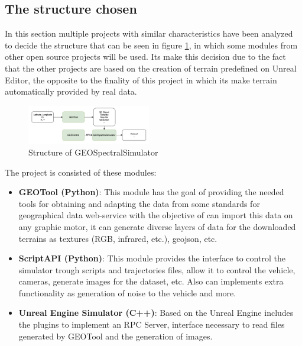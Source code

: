 \documentclass[10pt,a4paper,twocolumn,twoside]{article}
\begin{document}
\subsection{The structure chosen}

In this section multiple projects with similar characteristics have been analyzed to decide the structure that can be seen in figure \ref{fig-dronsimulatormodules}, in which some modules from other open source projects will be used. Its make this decision due to the fact that the other projects are based on the creation of terrain predefined on Unreal Editor, the opposite to the finality of this project in which its make terrain automatically provided by real data.

\begin{figure}[!h]
\centering
  	\includegraphics[width=0.48\textwidth]{structuretfg}
	\caption{Structure of GEOSpectralSimulator}
	\label{fig-dronsimulatormodules}
\end{figure}

The project is consisted of these modules:

\begin{itemize}
  \item \textbf{GEOTool (Python)}: This module has the goal of providing the needed tools for obtaining and adapting the data from some standards for geographical data web-service with the objective of can import this data on any graphic motor, it can generate diverse layers of data for the downloaded terrains as textures (RGB, infrared, etc.), geojson, etc. 
  
  \item \textbf{ScriptAPI (Python)}: This module provides the interface to control the simulator trough scripts and trajectories files, allow it to control the vehicle, cameras, generate images for the dataset, etc. Also can implements extra functionality as generation of noise to the vehicle and more.
  
  \item \textbf{Unreal Engine Simulator (C++)}: Based on the Unreal Engine includes the plugins to implement an RPC Server, interface necessary to read files generated by GEOTool and the generation of images.
\end{itemize}
\end{document}
